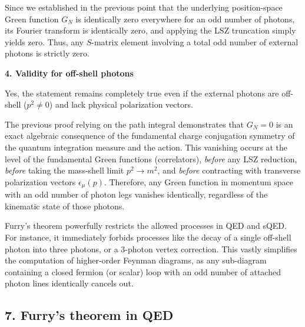 Since we established in the previous point that the underlying position-space Green function $G_N$ is identically zero everywhere for an odd number of photons, its Fourier transform is identically zero, and applying the LSZ truncation simply yields zero. Thus, any $S$-matrix element involving a total odd number of external photons is strictly zero.

\textbf{4. Validity for off-shell photons}

Yes, the statement remains completely true even if the external photons are off-shell ($p^2 \neq 0$) and lack physical polarization vectors.

The previous proof relying on the path integral demonstrates that $G_N = 0$ is an exact algebraic consequence of the fundamental charge conjugation symmetry of the quantum integration measure and the action. This vanishing occurs at the level of the fundamental Green functions (correlators), \textit{before} any LSZ reduction, \textit{before} taking the mass-shell limit $p^2 \to m^2$, and \textit{before} contracting with transverse polarization vectors $\epsilon_\mu(p)$. Therefore, any Green function in momentum space with an odd number of photon legs vanishes identically, regardless of the kinematic state of those photons.

\begin{remark}
    Furry's theorem powerfully restricts the allowed processes in QED and sQED. For instance, it immediately forbids processes like the decay of a single off-shell photon into three photons, or a 3-photon vertex correction. This vastly simplifies the computation of higher-order Feynman diagrams, as any sub-diagram containing a closed fermion (or scalar) loop with an odd number of attached photon lines identically cancels out.
\end{remark}


\subsection*{7. Furry's theorem in QED}

